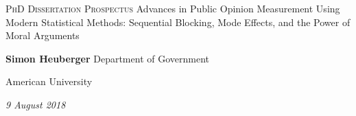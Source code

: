 \documentclass[12pt,]{article}
\begin{document}


{\begin{center}
{\Large{}\selectfont \scshape{{PhD Dissertation Prospectus}}}
\vskip 30pt
{\Large \doublespacing Advances in Public Opinion Measurement Using Modern Statistical Methods:
Sequential Blocking, Mode Effects, and the Power of Moral Arguments}
\vskip 30pt
\end{center}}






{\begin{center}
\textbf{Simon Heuberger} \vskip 0.1pt Department of Government   
	
American University

\vskip 30pt

{\itshape{9 August 2018}}

 
\end{center}}

\clearpage
\end{document}
